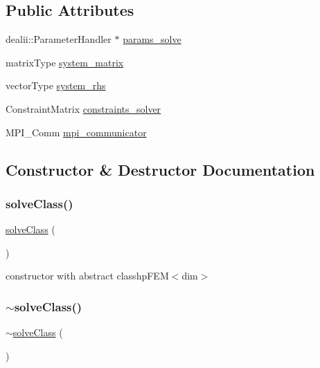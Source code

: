 \subsection*{Public Attributes}
\begin{DoxyCompactItemize}
\item 
dealii\+::\+Parameter\+Handler $\ast$ \mbox{\hyperlink{classsolve_class_a706fc42e2c257a3172aaeb3b1364a1a1}{params\+\_\+solve}}
\item 
matrix\+Type \mbox{\hyperlink{classsolve_class_a56f7357eb335f9ce4ac30bc30d7513e8}{system\+\_\+matrix}}
\item 
vector\+Type \mbox{\hyperlink{classsolve_class_a6c39fa839fdc40d2408946617a778571}{system\+\_\+rhs}}
\item 
Constraint\+Matrix \mbox{\hyperlink{classsolve_class_a2aaaefb2c7e18e09392c22659c344881}{constraints\+\_\+solver}}
\item 
M\+P\+I\+\_\+\+Comm \mbox{\hyperlink{classsolve_class_a03728ed636ca889ae407c84d181bc611}{mpi\+\_\+communicator}}
\end{DoxyCompactItemize}


\subsection{Constructor \& Destructor Documentation}
\mbox{\label{classsolve_class_ac210b30d39cb640ec4d65b667467583d}} 
\subsubsection{\texorpdfstring{solveClass()}{solveClass()}}
{\footnotesize\ttfamily \mbox{\hyperlink{classsolve_class}{solve\+Class}} (\begin{DoxyParamCaption}{ }\end{DoxyParamCaption})}

constructor with abstract classhp\+F\+E\+M$<$dim$>$ \mbox{\label{classsolve_class_a827189cdd4bd715d08e4cda1695c8409}} 
\subsubsection{\texorpdfstring{$\sim$solveClass()}{~solveClass()}}
{\footnotesize\ttfamily $\sim$\mbox{\hyperlink{classsolve_class}{solve\+Class}} (\begin{DoxyParamCaption}{ }\end{DoxyParamCaption})}



